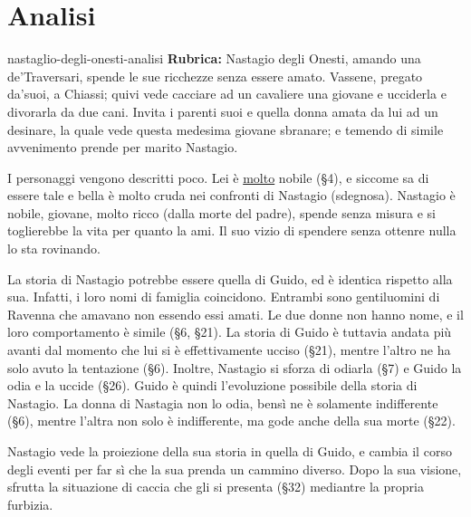 \documentclass[preview]{standalone}
\begin{document}
\genpage

\section{Analisi}

\begin{snippet}{nastaglio-degli-onesti-analisi}
    \textbf{Rubrica:} Nastagio degli Onesti, amando una de'Traversari,
    spende le sue ricchezze senza essere amato.
    Vassene, pregato da'suoi, a Chiassi; quivi vede cacciare ad un
    cavaliere una giovane e ucciderla e divorarla da due cani.
    Invita i parenti suoi e quella donna amata da lui ad un desinare,
    la quale vede questa medesima giovane sbranare; e temendo di simile avvenimento
    prende per marito Nastagio.
    
    
    I personaggi vengono descritti poco. Lei è \underline{molto} nobile (§4), e siccome sa di essere tale e bella
    è molto cruda nei confronti di Nastagio (sdegnosa). Nastagio è nobile, giovane, molto ricco (dalla morte del padre),
    spende senza misura e si toglierebbe la vita per quanto la ami. Il suo vizio di spendere senza ottenre nulla lo sta rovinando.
    
    La storia di Nastagio potrebbe essere quella di Guido, ed è identica rispetto alla sua.
    Infatti, i loro nomi di famiglia coincidono. Entrambi sono gentiluomini di Ravenna
    che amavano non essendo essi amati.
    Le due donne non hanno nome, e il loro comportamento è simile (§6, §21).
    La storia di Guido è tuttavia andata più avanti dal momento che lui si è effettivamente ucciso (§21), 
    mentre l'altro ne ha solo avuto la tentazione (§6).
    Inoltre, Nastagio si sforza di odiarla (§7) e Guido la odia e la uccide (§26).
    Guido è quindi l'evoluzione possibile della storia di Nastagio.
    La donna di Nastagia non lo odia, bensì ne è solamente indifferente (§6), mentre l'altra
    non solo è indifferente, ma gode anche della sua morte (§22).
    
    Nastagio vede la proiezione della sua storia in quella di Guido, e cambia il corso degli eventi per far sì che
    la sua prenda un cammino diverso.
    Dopo la sua visione, sfrutta la situazione di caccia che gli si presenta (§32) mediantre la propria furbizia.
    

\end{snippet}
\end{document}
